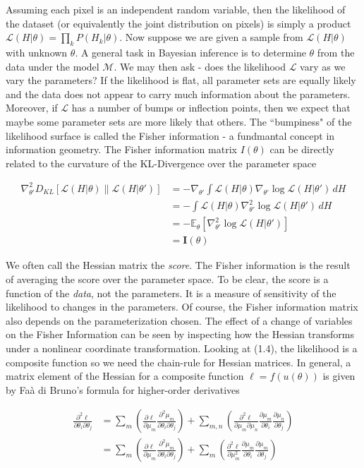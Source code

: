 \documentclass{ucetd}
\begin{document}
Assuming each pixel is an independent random variable, then the likelihood of the dataset (or equivalently the joint distribution on pixels) is simply a product $\mathcal{L}(H|\theta) = \prod_{k}P(H_{k}|\theta)$. Now suppose we are given a sample from $\mathcal{L}(H|\theta)$ with unknown $\theta$. A general task in Bayesian inference is to determine $\theta$ from the data under the model $\mathcal{M}$. We may then ask - does the likelihood $\mathcal{L}$ vary as we vary the parameters? If the likelihood is flat, all parameter sets are equally likely and the data does not appear to carry much information about the parameters. Moreover, if $\mathcal{L}$ has a number of bumps or inflection points, then we expect that maybe some parameter sets are more likely that others. The ``bumpiness" of the likelihood surface is called the Fisher information - a fundmantal concept in information geometry. The Fisher information matrix $I(\theta)$ can be directly related to the curvature of the KL-Divergence over the parameter space

\begin{align*}
\nabla^2_{\theta'} D_{KL}[\mathcal{L}(H|\theta) \parallel \mathcal{L}(H|\theta')] 
&= - \nabla_{\theta'} \int \mathcal{L}(H|\theta) \nabla_{\theta'}  \log \mathcal{L}(H|\theta') \, dH \\ 
&= - \int \mathcal{L}(H|\theta) \nabla^2_{\theta'}  \log \mathcal{L}(H|\theta') \, dH \\
&= - \mathbb{E}_{\theta}[\nabla^2_{\theta'} \log \mathcal{L}(H|\theta')] \\
&= \mathbf{I}(\theta)
\end{align*}


We often call the Hessian matrix the \emph{score}. The Fisher information is the result of averaging the score over the parameter space. To be clear, the score is a function of the \emph{data}, not the parameters. It is a measure of sensitivity of the likelihood to changes in the parameters. Of course, the Fisher information matrix also depends on the parameterization chosen. The effect of a change of variables on the Fisher Information can be seen by inspecting how the Hessian transforms under a nonlinear coordinate transformation. Looking at (1.4), the likelihood is a composite function so we need the chain-rule for Hessian matrices. In general, a matrix element of the Hessian for a composite function $\ell = f(u(\theta))$ is given by Faà di Bruno's formula for higher-order derivatives 

\begin{align*}
\frac{\partial^2 \ell}{\partial \theta_i \partial \theta_j} &= \sum_m \left(\frac{\partial \ell}{\partial \mu_m}\frac{\partial^2 \mu_m}{\partial \theta_i \partial \theta_j}\right) + \sum_{m,n} \left(\frac{\partial^2 \ell}{\partial \mu_m \partial \mu_n}\frac{\partial \mu_m}{\partial \theta_i}\frac{\partial \mu_n}{\partial \theta_j}\right)\\
&= \sum_m \left(\frac{\partial \ell}{\partial \mu_m}\frac{\partial^2 \mu_m}{\partial \theta_i \partial \theta_j}\right) + \sum_{m} \left(\frac{\partial^2 \ell}{\partial \mu_m^{2}}\frac{\partial \mu_m}{\partial \theta_i}\frac{\partial \mu_m}{\partial \theta_j}\right)
\end{align*}
\end{document}
